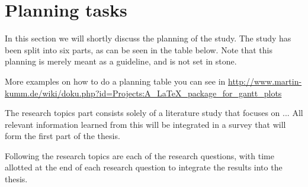 \section{Planning tasks}

In this section we will shortly discuss the planning of the study. The study has been split into six parts, as can be seen in the table below. Note that this planning is merely meant as a guideline, and is not set in stone.

More examples on how to do a planning table you can see in \url{http://www.martin-kumm.de/wiki/doku.php?id=Projects:A_LaTeX_package_for_gantt_plots}


\noindent{}


The research topics part consists solely of a literature study that focuses on ... All relevant information learned from this will be integrated in a survey that will form the first part of the thesis.

Following the research topics are each of the research questions, with time allotted at the end of each research question to integrate the results into the thesis. 